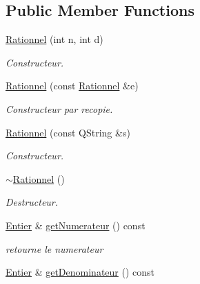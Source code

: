 \subsection*{Public Member Functions}
\begin{DoxyCompactItemize}
\item 
\hyperlink{classNombre_1_1Rationnel_ab0ee4363dc90feacdc79b0c78929059a}{Rationnel} (int n, int d)
\begin{DoxyCompactList}\small\item\em Constructeur. \item\end{DoxyCompactList}\item 
\hyperlink{classNombre_1_1Rationnel_a6271bc256512bcd61dfb7a671f6af90e}{Rationnel} (const \hyperlink{classNombre_1_1Rationnel}{Rationnel} \&e)
\begin{DoxyCompactList}\small\item\em Constructeur par recopie. \item\end{DoxyCompactList}\item 
\hyperlink{classNombre_1_1Rationnel_a9ceaf1d936e80578441fdd95181932eb}{Rationnel} (const QString \&s)
\begin{DoxyCompactList}\small\item\em Constructeur. \item\end{DoxyCompactList}\item 
\hyperlink{classNombre_1_1Rationnel_a436ac28026acabc38547f594c07ad6dd}{$\sim$Rationnel} ()
\begin{DoxyCompactList}\small\item\em Destructeur. \item\end{DoxyCompactList}\item 
\hypertarget{classNombre_1_1Rationnel_a87e5a70d65efb04d24e4501c49e93793}{
\hyperlink{classNombre_1_1Entier}{Entier} \& \hyperlink{classNombre_1_1Rationnel_a87e5a70d65efb04d24e4501c49e93793}{getNumerateur} () const }
\label{classNombre_1_1Rationnel_a87e5a70d65efb04d24e4501c49e93793}

\begin{DoxyCompactList}\small\item\em retourne le numerateur \item\end{DoxyCompactList}\item 
\hypertarget{classNombre_1_1Rationnel_a7c3f2070efba44aa67ea1c4fe8c22704}{
\hyperlink{classNombre_1_1Entier}{Entier} \& \hyperlink{classNombre_1_1Rationnel_a7c3f2070efba44aa67ea1c4fe8c22704}{getDenominateur} () const }
\label{classNombre_1_1Rationnel_a7c3f2070efba44aa67ea1c4fe8c22704}


\end{DoxyCompactItemize}

